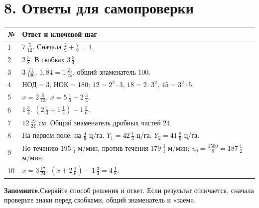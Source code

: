 \documentclass[a4paper,12pt]{article}
\newcommand{\sectionline}[1]{\section*{\color{darkaccent}#1}}
\newcommand{\keyidea}[1]{\par\noindent\textcolor{darkaccent}{\textbf{Запомните.}}\enspace #1\par}
\newcommand{\mix}[3]{#1\,\frac{#2}{#3}}
\begin{document}
\clearpage
\sectionline{8. Ответы для самопроверки}
\renewcommand{\arraystretch}{1.4}
\begin{tabularx}{\linewidth}{@{}p{10mm}X@{}}
\toprule
\textbf{№} & \textbf{Ответ и ключевой шаг}\\
\midrule
1 & $\mix{7}{5}{12}$.
Сначала $\frac29+\frac79=1$.\\
2 & $\mix{2}{5}{8}$.
В скобках $\mix{3}{3}{4}$.\\
3 & $\mix{3}{71}{100}$.
$1{,}84=\mix{1}{21}{25}$, общий знаменатель $100$.\\
4 & $\text{НОД}=3$, $\text{НОК}=180$;
$12=2^2\cdot3$, $18=2\cdot3^2$, $45=3^2\cdot5$.\\
5 & $x=\mix{2}{5}{12}$.
$x=\mix{5}{1}{6}-\mix{2}{3}{4}$.\\
6 & $\mix{1}{3}{4}$.
$(\mix{2}{1}{3}+\mix{1}{1}{4})-\mix{1}{5}{6}$.\\
7 & $\mix{12}{19}{24}$ см.
Общий знаменатель дробных частей $24$.\\
8 & На первом поле; на $\frac49$ ц/га.
$Y_1=\mix{42}{1}{3}$ ц/га, $Y_2=\mix{41}{8}{9}$ ц/га.\\
9 & По течению $\mix{195}{1}{4}$ м/мин,
против течения $\mix{179}{3}{4}$ м/мин;
$v_0=\frac{1500}{8}=\mix{187}{1}{2}$ м/мин.\\
10 & $x=\mix{3}{17}{24}$.
$(x+\mix{2}{1}{6})-\mix{1}{3}{4}=\mix{4}{1}{8}$.\\
\bottomrule
\end{tabularx}
\vspace{8mm}
\keyidea{Сверяйте способ решения и ответ. Если результат отличается,
сначала проверьте знаки перед скобками, общий знаменатель и «заём».}
\end{document}
